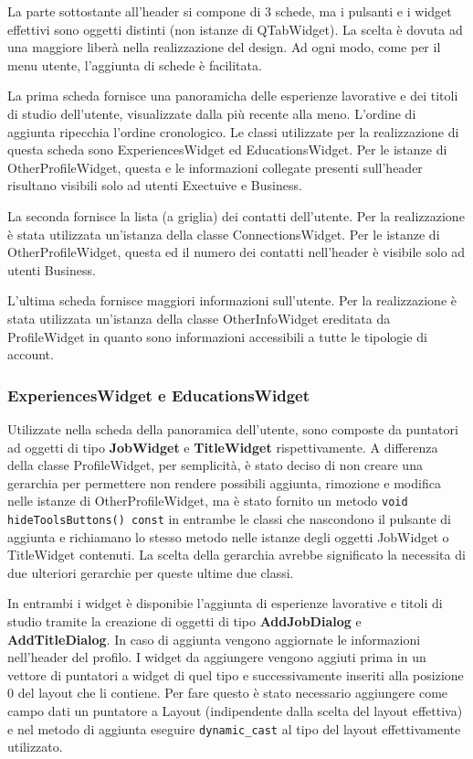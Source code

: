 \documentclass[a4paper]{article}
\begin{document}
La parte sottostante all'header si compone di 3 schede, ma i pulsanti e i widget effettivi sono oggetti distinti (non istanze di QTabWidget). La scelta è dovuta ad una maggiore liberà nella realizzazione del design. Ad ogni modo, come per il menu utente, l'aggiunta di schede è facilitata. 

La prima scheda fornisce una panoramicha delle esperienze lavorative e dei titoli di studio dell'utente, visualizzate dalla più recente alla meno. L'ordine di aggiunta ripecchia l'ordine cronologico. Le classi utilizzate per la realizzazione di questa scheda sono ExperiencesWidget ed EducationsWidget. Per le istanze di OtherProfileWidget, questa e le informazioni collegate presenti sull'header risultano visibili solo ad utenti Exectuive e Business.

La seconda fornisce la lista (a griglia) dei contatti dell'utente. Per la realizzazione è stata utilizzata un'istanza della classe ConnectionsWidget. Per le istanze di OtherProfileWidget, questa ed il numero dei contatti nell'header è visibile solo ad utenti Business.

L'ultima scheda fornisce maggiori informazioni sull'utente. Per la realizzazione è stata utilizzata un'istanza della classe OtherInfoWidget ereditata da ProfileWidget in quanto sono informazioni accessibili a tutte le tipologie di account.

\subsubsection*{ExperiencesWidget e EducationsWidget}
Utilizzate nella scheda della panoramica dell'utente, sono composte da puntatori ad oggetti di tipo \textbf{JobWidget} e \textbf{TitleWidget} rispettivamente. A differenza della classe ProfileWidget, per semplicità, è stato deciso di non creare una gerarchia per permettere non rendere possibili aggiunta, rimozione e modifica nelle istanze di OtherProfileWidget, ma è stato fornito un metodo \texttt{void hideToolsButtons() const} in entrambe le classi che nascondono il pulsante di aggiunta e richiamano lo stesso metodo nelle istanze degli oggetti JobWidget o TitleWidget contenuti. La scelta della gerarchia avrebbe significato la necessita di due ulteriori gerarchie per queste ultime due classi.

In entrambi i widget è disponibie l'aggiunta di esperienze lavorative e titoli di studio tramite la creazione di oggetti di tipo \textbf{AddJobDialog} e \textbf{AddTitleDialog}. In caso di aggiunta vengono aggiornate le informazioni nell'header del profilo. I widget da aggiungere vengono aggiuti prima in un vettore di puntatori a widget di quel tipo e successivamente inseriti alla posizione 0 del layout che li contiene. Per fare questo è stato necessario aggiungere come campo dati un puntatore a Layout (indipendente dalla scelta del layout effettiva) e nel metodo di aggiunta eseguire \texttt{dynamic\_cast} al tipo del layout effettivamente utilizzato.
\end{document}
